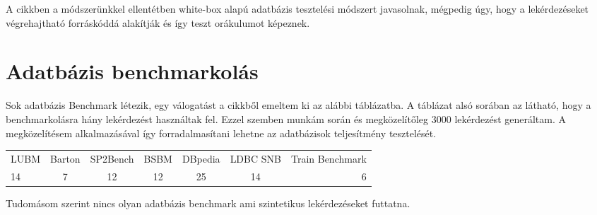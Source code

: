 A \cite{DBLP} cikkben a módszerünkkel ellentétben white-box alapú adatbázis tesztelési módszert javasolnak, mégpedig úgy, hogy a lekérdezéseket végrehajtható forráskóddá alakítják és így teszt orákulumot képeznek.



\section{Adatbázis benchmarkolás}
Sok adatbázis Benchmark létezik, egy válogatást a \cite{szarnyas2018train} cikkből emeltem ki az alábbi táblázatba. A táblázat alsó sorában az látható, hogy a benchmarkolásra hány lekérdezést használtak fel. Ezzel szemben munkám során és megközelítőleg 3000 lekérdezést generáltam. A megközelítésem alkalmazásával így forradalmasítani lehetne az adatbázisok teljesítmény tesztelését. 

\begin{center}
	\begin{tabular}{ l | c | c | c | c | c | r }
 LUBM & Barton & SP2Bench & 	BSBM & DBpedia & LDBC SNB &	Train Benchmark \\
 14 & 7 & 12 & 12 &	25 & 14 & 	6 \\
	\end{tabular}
\end{center}


Tudomásom szerint nincs olyan adatbázis benchmark ami szintetikus lekérdezéseket futtatna.